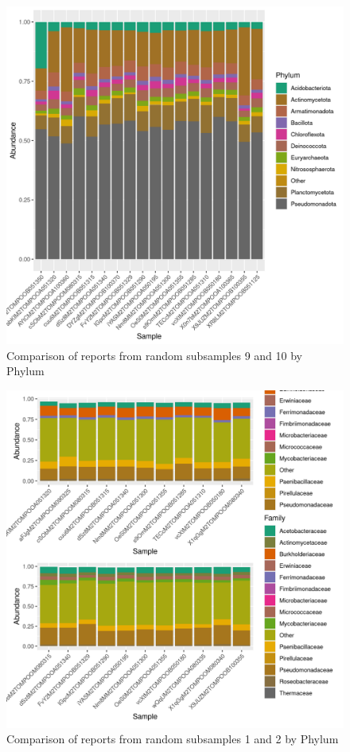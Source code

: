 \documentclass{article}
\begin{document}
\begin{figure}
\centering
\includegraphics[scale=0.8]{reporte_tomate1.csv_NA_relative_abundance_Phylum.png}
\caption{Comparison of reports from random subsamples 9 and 10 by Phylum}
\end{figure}

\begin{figure}
\centering
\includegraphics[scale=0.8]{otus_centrales_tomate_aleatorio1_1.csv_otus_centrales_tomate_aleatorio1_2.csv_relative_abundance_Family.png}
\caption{Comparison of reports from random subsamples 1 and 2 by Phylum}
\end{figure}
\end{document}
